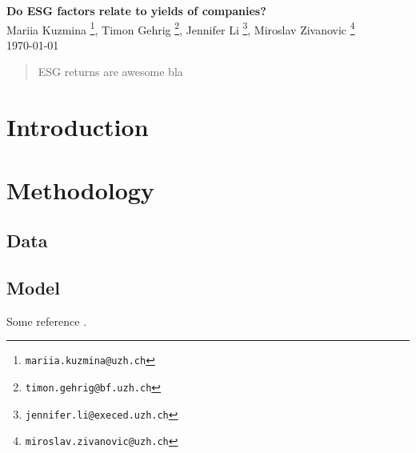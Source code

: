 \documentclass[12pt, a4paper]{article}%
\begin{document}
%
%

\begin{titlepage}

\setlength{\topmargin}{0.5cm}

\center

{\Large \bfseries Do ESG factors relate to yields of companies?
}\\[0.5cm] 

Mariia Kuzmina \footnote{\texttt{mariia.kuzmina@uzh.ch}},
Timon Gehrig \footnote{\texttt{timon.gehrig@bf.uzh.ch}},
Jennifer Li \footnote{\texttt{jennifer.li@execed.uzh.ch}},
Miroslav Zivanovic \footnote{\texttt{miroslav.zivanovic@uzh.ch}}\\
\today
\\ [2cm]

\begin{abstract}
ESG returns are awesome bla 
\end{abstract}

\vspace{3cm}



\vfill 
\end{titlepage}

\tableofcontents


%
%
\newpage
\section{Introduction}


%
%												   

\section{Methodology}

\subsection{Data}

\subsection{Model}
Some reference \cite{Paolellalinear}.
\end{document}
